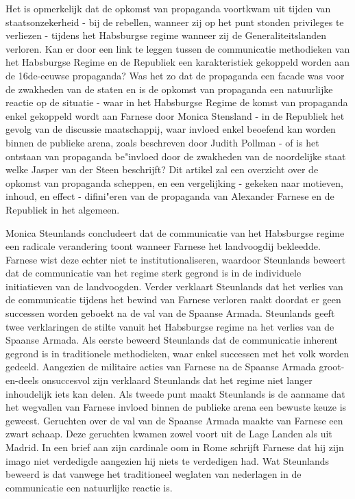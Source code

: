\documentclass[11pt]{amsart}
\begin{document}
Het is opmerkelijk dat de opkomst van propaganda voortkwam uit tijden van staatsonzekerheid - bij de rebellen, wanneer
zij op het punt stonden privileges te verliezen - tijdens het Habsburgse regime wanneer zij de Generaliteitslanden
verloren. Kan er door een link te leggen tussen de communicatie methodieken van het Habsburgse Regime en de Republiek
een karakteristiek gekoppeld worden aan de 16de-eeuwse propaganda? Was het zo dat de propaganda een facade was voor de
zwakheden van de staten en is de opkomst van propaganda een natuurlijke reactie op de situatie - waar in het Habsburgse
Regime de komst van propaganda enkel gekoppeld wordt aan Farnese door Monica Stensland - in de Republiek het gevolg van
de discussie maatschappij, waar invloed enkel beoefend kan worden binnen de publieke arena, zoals beschreven door
Judith Pollman - of is het ontstaan van propaganda be"invloed door de zwakheden van de noordelijke staat welke Jasper
van der Steen beschrijft? Dit artikel zal een overzicht over de opkomst van propaganda scheppen, en een vergelijking -
gekeken naar motieven, inhoud, en effect - difini"eren van de propaganda van Alexander Farnese en de Republiek in het
algemeen.

Monica Steunlands concludeert dat de communicatie van het Habsburgse regime een radicale verandering toont wanneer
Farnese het landvoogdij bekleedde. Farnese wist deze echter niet te institutionaliseren, waardoor Steunlands beweert
dat de communicatie van het regime sterk gegrond is in de individuele initiatieven van de landvoogden. Verder verklaart
Steunlands dat het verlies van de communicatie tijdens het bewind van Farnese verloren raakt doordat er geen successen
worden geboekt na de val van de Spaanse Armada. Steunlands geeft twee verklaringen de stilte vanuit het Habsburgse
regime na het verlies van de Spaanse Armada. Als eerste beweerd Steunlands dat de communicatie inherent gegrond is in
traditionele methodieken, waar enkel successen met het volk worden gedeeld. Aangezien de militaire acties van Farnese
na de Spaanse Armada groot-en-deels onsuccesvol zijn verklaard Steunlands dat het regime niet langer inhoudelijk iets
kan delen. Als tweede punt maakt Steunlands is de aanname dat het wegvallen van Farnese invloed binnen de publieke
arena een bewuste keuze is geweest. Geruchten over de val van de Spaanse Armada maakte van Farnese een zwart schaap.
Deze geruchten kwamen zowel voort uit de Lage Landen als uit Madrid. In een brief aan zijn cardinale oom in Rome
schrijft Farnese dat hij zijn imago niet verdedigde aangezien hij niets te verdedigen had. Wat Steunlands beweerd is
dat vanwege het traditioneel weglaten van nederlagen in de communicatie een natuurlijke reactie is.
\end{document}
